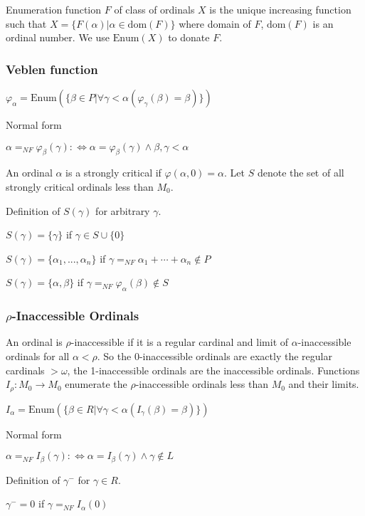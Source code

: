 \documentclass[10pt]{article}
\begin{document}
Enumeration function \(F\) of class of ordinals \(X\) is the unique increasing function such that \(X=\{F(\alpha)|\alpha\in\text{dom}(F)\}\) where domain of \(F\), \(\text{dom}(F)\) is an ordinal number. We use \(\text{Enum}(X)\) to donate \(F\).


\subsubsection{Veblen function}

\(\varphi_\alpha=\text{Enum}(\{\beta\in P|\forall\gamma<\alpha(\varphi_\gamma(\beta)=\beta)\})\)

Normal form

\(\alpha=_{NF}\varphi_\beta(\gamma):\Leftrightarrow\alpha=\varphi_\beta(\gamma)\wedge\beta,\gamma<\alpha\)

An ordinal \(\alpha\) is a strongly critical if \(\varphi(\alpha,0)=\alpha\). Let \(S\) denote the set of
all strongly critical ordinals less than \(M_0\).

Definition of \(S(\gamma)\) for arbitrary \(\gamma\).

\(S(\gamma)=\{\gamma\}\) if \(\gamma\in S\cup\{0\}\)

\(S(\gamma)=\{\alpha_1,...,\alpha_n\}\) if \(\gamma=_{NF}\alpha_1+\cdots+\alpha_n\notin P\)

\(S(\gamma)=\{\alpha,\beta\}\) if \(\gamma=_{NF}\varphi_\alpha(\beta)\notin S\)


\subsubsection{\(\rho\)-Inaccessible Ordinals}

An ordinal is \(\rho\)-inaccessible if it is a regular cardinal and limit of \(\alpha\)-inaccessible ordinals for all \(\alpha<\rho\). So the 0-inaccessible ordinals are exactly the regular cardinals \(>\omega\), the 1-inaccessible ordinals are the inaccessible ordinals. Functions \(I_\rho:M_0 \rightarrow M_0\) enumerate the \(\rho\)-inaccessible ordinals less than \(M_0\) and their limits.

\(I_\alpha=\text{Enum}(\{\beta\in R|\forall\gamma<\alpha(I_\gamma(\beta)=\beta)\}) \)

Normal form

\(\alpha=_{NF}I_\beta(\gamma):\Leftrightarrow\alpha=I_\beta(\gamma)\wedge\gamma\notin L\)

Definition of \(\gamma^{-}\) for \(\gamma\in R\).

\(\gamma^{-}=0\) if \(\gamma=_{NF}I_\alpha(0)\)
\end{document}
